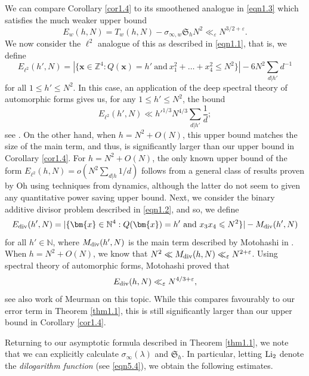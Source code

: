 \documentclass[12pt,reqno]{amsart}
\theoremstyle{definition}
\theoremstyle{remark}
\numberwithin{equation}{section}
\renewcommand{\leq}{\leqslant}
\def\eps{\varepsilon}
\newcommand\1{\mathds{1}}
\renewcommand\vec{\bm}
\begin{document}
We can compare Corollary \ref{cor1.4} to its smoothened analogue in \eqref{eqn1.3} which satisfies the much weaker upper bound
\[ E_{w}(h,N) = T_{w}(h,N) - \sigma_{\infty,w} \mathfrak{S}_h N^2 \ll_{\eps} N^{3/2 + \eps}. \]
We now consider the $\ell^2$ analogue of this as described in \eqref{eqn1.1}, that is, we define
\[ 
E_{\ell^2}(h',N) = |\{ \vec{x} \in \mathbb{Z}^4:   Q(\vec{x}) = h' \ \text{and}  \ x_1^2 + \dots + x_4^2 \leq N^2\}| -  6 N^2 \sum_{d|h'} d^{-1}\]
for all $1 \leq h' \leq N^2$. In this case, an application of the deep spectral theory of automorphic forms gives us, for any $1 \leq h' \leq N^2$, the bound
\[ E_{\ell^2}(h',N)  \ll h'^{1/3} N^{4/3} \sum_{d|h'} \frac{1}{d}; \]
see \cite[Theorem 12.4]{Iw2002}. On the other hand, when $h = N^2 + O(N)$, this upper bound matches the size of the main term, and thus, is significantly larger than our upper bound in Corollary \ref{cor1.4}. For $h = N^2 + O(N)$, the only known upper bound of the form $E_{\ell^2}(h,N) = o(N^2 \sum_{d|h}1/d)$ follows from a general class of results proven by Oh \cite{Oh2004} using techniques from dynamics, although the latter do not seem to given any quantitative power saving upper bound. Next, we consider the binary additive divisor problem described in \eqref{eqn1.2}, and so, we define
\[ E_{\rm div}(h',N) = |\{ \vec{x} \in \mathbb{N}^4 : Q(\vec{x}) = h' \ \text{and}  \ x_3 x_4 \leq N^2  \}| - M_{\rm div}(h',N) \]
for all $h' \in \mathbb{N}$, where $M_{\rm div}(h',N)$ is the main term described by Motohashi in \cite[Theorem 1]{Mo1994}. When $h = N^2 + O(N)$, we know that $N^2 \ll M_{\rm div}(h,N) \ll_{\eps} N^{2 + \eps}$. Using spectral theory of automorphic forms, Motohashi \cite{Mo1994} proved that 
\[ E_{\rm div}(h,N) \ll_{\eps} N^{4/3 + \eps}, \]
see also work of Meurman \cite{Meu2001} on this topic. While this compares favourably to our error term in Theorem \ref{thm1.1}, this is still significantly larger than our upper bound in Corollary \ref{cor1.4}. 

Returning to our asymptotic formula described in Theorem \ref{thm1.1}, we note that we can  explicitly calculate $\sigma_{\infty}(\lambda)$ and $\mathfrak{S}_h$. In particular, letting ${\rm Li}_2$ denote the \emph{dilogarithm function} (see \eqref{eqn5.4}), we obtain the following estimates.
\end{document}
